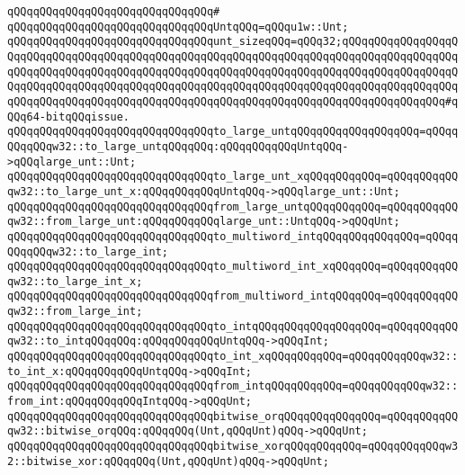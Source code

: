 \verb|qQQqqQQqqQQqqQQqqQQqqQQqqQQqqQQq#|\newline
\verb|qQQqqQQqqQQqqQQqqQQqqQQqqQQqqQQqUntqQQq=qQQqu1w::Unt;|\newline
\newline
\verb|qQQqqQQqqQQqqQQqqQQqqQQqqQQqqQQqunt_sizeqQQq=qQQq32;qQQqqQQqqQQqqQQqqQQqqQQqqQQqqQQqqQQqqQQqqQQqqQQqqQQqqQQqqQQqqQQqqQQqqQQqqQQqqQQqqQQqqQQqqQQqqQQqqQQqqQQqqQQqqQQqqQQqqQQqqQQqqQQqqQQqqQQqqQQqqQQqqQQqqQQqqQQqqQQqqQQqqQQqqQQqqQQqqQQqqQQqqQQqqQQqqQQqqQQqqQQqqQQqqQQqqQQqqQQqqQQqqQQqqQQqqQQqqQQqqQQqqQQqqQQqqQQqqQQqqQQqqQQqqQQqqQQqqQQqqQQqqQQqqQQqqQQq#qQQq64-bitqQQqissue.|\newline
\newline
\verb|qQQqqQQqqQQqqQQqqQQqqQQqqQQqqQQqto_large_untqQQqqQQqqQQqqQQqqQQq=qQQqqQQqqQQqw32::to_large_untqQQqqQQq:qQQqqQQqqQQqUntqQQq->qQQqlarge_unt::Unt;|\newline
\verb|qQQqqQQqqQQqqQQqqQQqqQQqqQQqqQQqto_large_unt_xqQQqqQQqqQQq=qQQqqQQqqQQqw32::to_large_unt_x:qQQqqQQqqQQqUntqQQq->qQQqlarge_unt::Unt;|\newline
\verb|qQQqqQQqqQQqqQQqqQQqqQQqqQQqqQQqfrom_large_untqQQqqQQqqQQq=qQQqqQQqqQQqw32::from_large_unt:qQQqqQQqqQQqlarge_unt::UntqQQq->qQQqUnt;|\newline
\newline
\verb|qQQqqQQqqQQqqQQqqQQqqQQqqQQqqQQqto_multiword_intqQQqqQQqqQQqqQQq=qQQqqQQqqQQqw32::to_large_int;|\newline
\verb|qQQqqQQqqQQqqQQqqQQqqQQqqQQqqQQqto_multiword_int_xqQQqqQQq=qQQqqQQqqQQqw32::to_large_int_x;|\newline
\verb|qQQqqQQqqQQqqQQqqQQqqQQqqQQqqQQqfrom_multiword_intqQQqqQQq=qQQqqQQqqQQqw32::from_large_int;|\newline
\newline
\verb|qQQqqQQqqQQqqQQqqQQqqQQqqQQqqQQqto_intqQQqqQQqqQQqqQQqqQQq=qQQqqQQqqQQqw32::to_intqQQqqQQq:qQQqqQQqqQQqUntqQQq->qQQqInt;|\newline
\verb|qQQqqQQqqQQqqQQqqQQqqQQqqQQqqQQqto_int_xqQQqqQQqqQQq=qQQqqQQqqQQqw32::to_int_x:qQQqqQQqqQQqUntqQQq->qQQqInt;|\newline
\verb|qQQqqQQqqQQqqQQqqQQqqQQqqQQqqQQqfrom_intqQQqqQQqqQQq=qQQqqQQqqQQqw32::from_int:qQQqqQQqqQQqIntqQQq->qQQqUnt;|\newline
\newline
\verb|qQQqqQQqqQQqqQQqqQQqqQQqqQQqqQQqbitwise_orqQQqqQQqqQQqqQQq=qQQqqQQqqQQqw32::bitwise_orqQQq:qQQqqQQq(Unt,qQQqUnt)qQQq->qQQqUnt;|\newline
\verb|qQQqqQQqqQQqqQQqqQQqqQQqqQQqqQQqbitwise_xorqQQqqQQqqQQq=qQQqqQQqqQQqw32::bitwise_xor:qQQqqQQq(Unt,qQQqUnt)qQQq->qQQqUnt;|\newline
